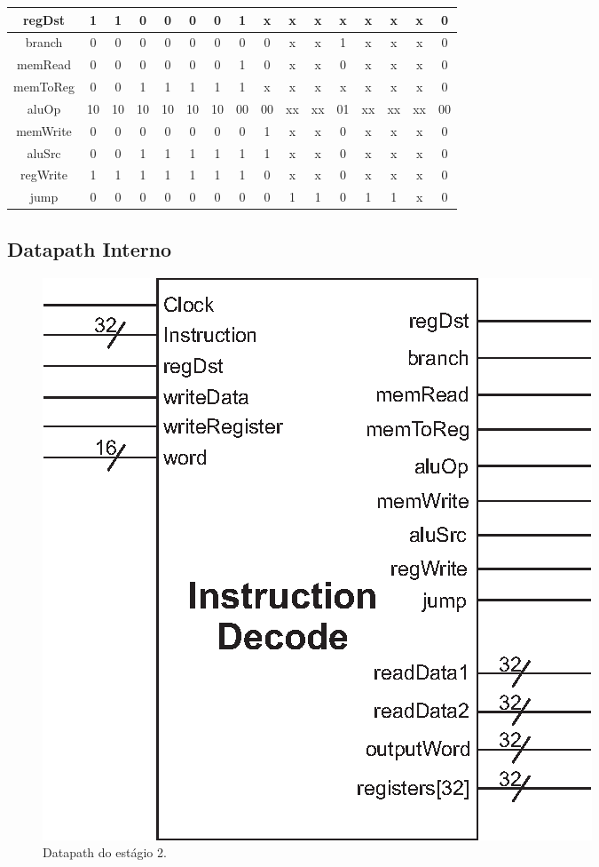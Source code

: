 \begin{center}
\begin{longtable}[pos]{| c | c | c | c | c | c | c | c | c | c | c | c | c | c | c | c |}
			regDst & 1 & 1 & 0 & 0 & 0 & 0 & 1 & x & x & x & x & x&x &x&0\\ \hline
            branch & 0 & 0 & 0 & 0 & 0 & 0 & 0 & 0 & x & x & 1 & x&x&x&0\\ \hline
            memRead & 0 & 0 & 0 & 0 & 0 & 0 & 1 & 0 & x & x & 0 & x&x&x&0\\ \hline
            memToReg & 0 & 0 & 1 & 1 & 1 & 1 & 1 & x & x & x & x & x&x&x&0\\ \hline
            aluOp & 10 & 10 & 10 & 10 & 10 & 10 & 00 & 00 & xx & xx & 01& xx&xx&xx&00 \\ \hline
            memWrite & 0 & 0 & 0 & 0 & 0 & 0 & 0 & 1 & x & x & 0& x&x&x&0\\ \hline
            aluSrc & 0 & 0 & 1 & 1 & 1 & 1 & 1 & 1 & x & x & 0&x&x&x&0\\ \hline
            regWrite & 1 & 1 & 1 & 1 & 1 & 1 & 1 & 0 & x & x & 0&x&x&x&0\\ \hline
            jump & 0 & 0 & 0 & 0 & 0 & 0 & 0 & 0 & 1 & 1 & 0&1&1&x&0\\ \hline
		\end{longtable}
	\end{center}
    
	
	\subsection{Datapath Interno}
	
	\begin{figure}[ht]
		\begin{center}
		\includegraphics{./datapath/Graphic2.eps}
		\caption*{Datapath do estágio 2.}
		\end{center}
	\end{figure}